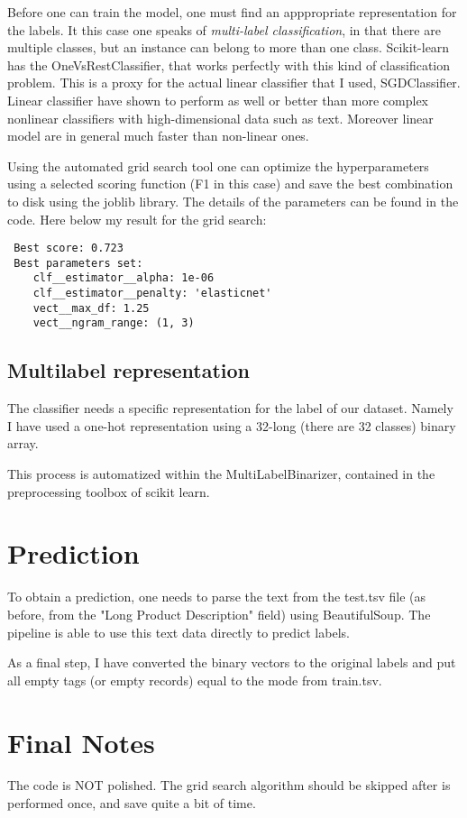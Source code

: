 \documentclass{article}
\begin{document}
Before one can train the model, one must find an apppropriate representation
for the labels. It this case one speaks of \emph{multi-label classification},
in that there are multiple classes, but an instance can belong to more than
one class.
Scikit-learn has the OneVsRestClassifier, that works perfectly with this
kind of classification problem.
This is a proxy for the actual linear classifier that I used, SGDClassifier.
Linear classifier have shown to perform as well or better
than more complex nonlinear
classifiers with high-dimensional data such as text.
Moreover linear model are in general much faster than non-linear ones.

Using the automated grid search tool one can optimize the hyperparameters
using a selected scoring function (F1 in this case)
and save the best combination to disk using the joblib library.
The details of the parameters can be found in the code.
Here below my result for the grid search:
\begin{verbatim}
 Best score: 0.723
 Best parameters set:
	clf__estimator__alpha: 1e-06
	clf__estimator__penalty: 'elasticnet'
	vect__max_df: 1.25
	vect__ngram_range: (1, 3)
\end{verbatim}

\subsection{Multilabel representation}

The classifier needs a specific representation for the label of our dataset.
Namely I have used a one-hot representation using a 32-long (there are 32 classes)
binary array.

This process is automatized within the MultiLabelBinarizer, contained
in the preprocessing toolbox of scikit learn.


\section{Prediction}

To obtain a prediction, one needs to parse the text from the test.tsv file
(as before, from the "Long Product Description" field) using BeautifulSoup.
The pipeline is able to use this text data directly to predict labels.

As a final step, I have converted the binary vectors to the original labels
and put all empty tags (or empty records) equal to the mode from train.tsv.


\section{Final Notes}

The code is NOT polished.
The grid search algorithm should be skipped after is performed once,
and save quite a bit of time.
\end{document}
